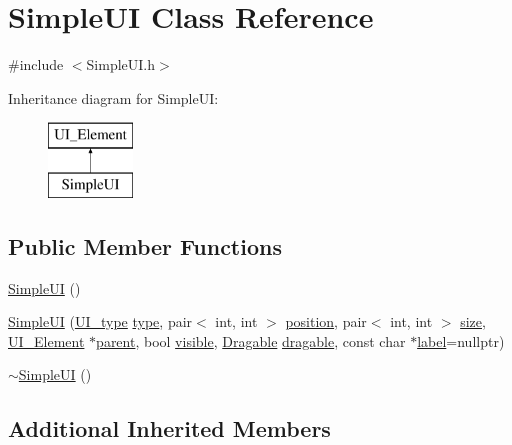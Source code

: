 \hypertarget{class_simple_u_i}{}\section{Simple\+UI Class Reference}
\label{class_simple_u_i}


{\ttfamily \#include $<$Simple\+U\+I.\+h$>$}

Inheritance diagram for Simple\+UI\+:\begin{figure}[H]
\begin{center}
\leavevmode
\includegraphics[height=2.000000cm]{class_simple_u_i}
\end{center}
\end{figure}
\subsection*{Public Member Functions}
\begin{DoxyCompactItemize}
\item 
\mbox{\hyperlink{class_simple_u_i_a4375856e165bd5c4721921f1d5714f65}{Simple\+UI}} ()
\item 
\mbox{\hyperlink{class_simple_u_i_a372da94e2ebeb6b4fc36617bf620a3a4}{Simple\+UI}} (\mbox{\hyperlink{class_u_i___element_a7ed595c46c75d53d30fa3813b036cf1e}{U\+I\+\_\+type}} \mbox{\hyperlink{class_u_i___element_ad40069673afbc9b0fbd596ef164e8e92}{type}}, pair$<$ int, int $>$ \mbox{\hyperlink{class_u_i___element_a47f8f59e3f076f611948eb7aee09d943}{position}}, pair$<$ int, int $>$ \mbox{\hyperlink{class_u_i___element_a6a5d2f29f12914f3806a82c4834746e6}{size}}, \mbox{\hyperlink{class_u_i___element}{U\+I\+\_\+\+Element}} $\ast$\mbox{\hyperlink{class_u_i___element_a3e9ec27fe0cc3d30c351a9405733439f}{parent}}, bool \mbox{\hyperlink{class_u_i___element_a78aac2800a8d8db3ab76caddf3ece0c4}{visible}}, \mbox{\hyperlink{struct_dragable}{Dragable}} \mbox{\hyperlink{class_u_i___element_ac2b4266648ab33c1a486bfa8fd79d474}{dragable}}, const char $\ast$\mbox{\hyperlink{class_u_i___element_ad7c19958ef5519d577f543676235bf93}{label}}=nullptr)
\item 
\mbox{\hyperlink{class_simple_u_i_a95cfaa895ce80b4ddbdfc2bd57f8f83b}{$\sim$\+Simple\+UI}} ()
\end{DoxyCompactItemize}
\subsection*{Additional Inherited Members}


